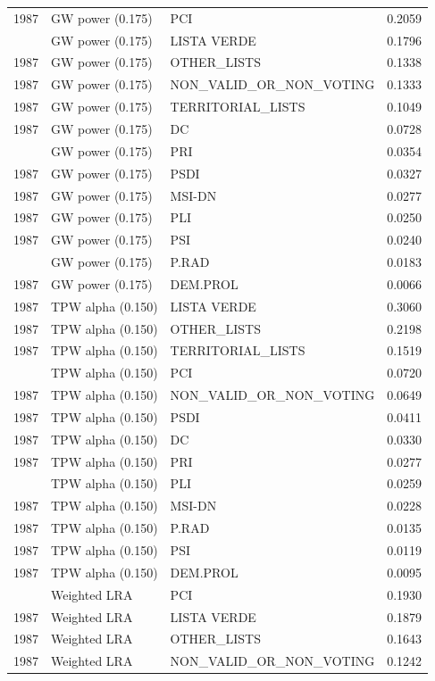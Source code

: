 \begin{longtable}[t]{rllr}
1987 & GW power (0.175) & PCI & 0.2059\\
\addlinespace
1987 & GW power (0.175) & LISTA VERDE & 0.1796\\
1987 & GW power (0.175) & OTHER\_LISTS & 0.1338\\
1987 & GW power (0.175) & NON\_VALID\_OR\_NON\_VOTING & 0.1333\\
1987 & GW power (0.175) & TERRITORIAL\_LISTS & 0.1049\\
1987 & GW power (0.175) & DC & 0.0728\\
\addlinespace
1987 & GW power (0.175) & PRI & 0.0354\\
1987 & GW power (0.175) & PSDI & 0.0327\\
1987 & GW power (0.175) & MSI-DN & 0.0277\\
1987 & GW power (0.175) & PLI & 0.0250\\
1987 & GW power (0.175) & PSI & 0.0240\\
\addlinespace
1987 & GW power (0.175) & P.RAD & 0.0183\\
1987 & GW power (0.175) & DEM.PROL & 0.0066\\
1987 & TPW alpha (0.150) & LISTA VERDE & 0.3060\\
1987 & TPW alpha (0.150) & OTHER\_LISTS & 0.2198\\
1987 & TPW alpha (0.150) & TERRITORIAL\_LISTS & 0.1519\\
\addlinespace
1987 & TPW alpha (0.150) & PCI & 0.0720\\
1987 & TPW alpha (0.150) & NON\_VALID\_OR\_NON\_VOTING & 0.0649\\
1987 & TPW alpha (0.150) & PSDI & 0.0411\\
1987 & TPW alpha (0.150) & DC & 0.0330\\
1987 & TPW alpha (0.150) & PRI & 0.0277\\
\addlinespace
1987 & TPW alpha (0.150) & PLI & 0.0259\\
1987 & TPW alpha (0.150) & MSI-DN & 0.0228\\
1987 & TPW alpha (0.150) & P.RAD & 0.0135\\
1987 & TPW alpha (0.150) & PSI & 0.0119\\
1987 & TPW alpha (0.150) & DEM.PROL & 0.0095\\
\addlinespace
1987 & Weighted LRA & PCI & 0.1930\\
1987 & Weighted LRA & LISTA VERDE & 0.1879\\
1987 & Weighted LRA & OTHER\_LISTS & 0.1643\\
1987 & Weighted LRA & NON\_VALID\_OR\_NON\_VOTING & 0.1242\\

\end{longtable}
